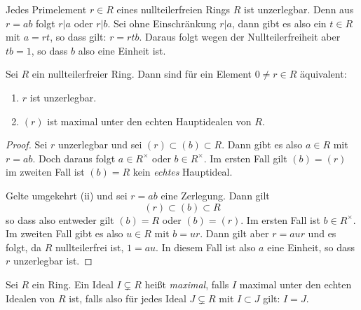 \documentclass{book}
\begin{document}
\begin{exa}
    \label{exa:primunzer}
    Jedes Primelement $r \in R$ eines nullteilerfreien Rings $R$ ist
    unzerlegbar. Denn aus $r = ab$ folgt $r | a$ oder $r | b$. Sei ohne
    Einschränkung $r|a$, dann gibt es also ein $t \in R$ mit $a = rt$, so dass
    gilt: $r = rtb$. Daraus folgt wegen der Nullteilerfreiheit aber $tb = 1$,
    so dass $b$ also eine Einheit ist. 
\end{exa}

\begin{prop}
    \label{prop:maximalhaupt}
    Sei $R$ ein nullteilerfreier Ring. Dann sind für ein Element $0 \ne r \in R$ äquivalent:
    \begin{enumerate}[label=(\roman *)]
        \item $r$ ist unzerlegbar.
        \item $(r)$ ist maximal unter den echten Hauptidealen von $R$. 
    \end{enumerate}
\end{prop}
\begin{proof}
    Sei $r$ unzerlegbar und sei $(r) \subset (b) \subset R$. Dann gibt es also
    $a \in R$ mit $r = ab$. Doch daraus folgt $a \in R^{\times}$ oder $b \in
    R^{\times}$. Im ersten Fall gilt $(b) = (r)$ im zweiten Fall ist $(b) = R$
    kein \emph{echtes} Hauptideal. 

    Gelte umgekehrt (ii) und sei $r = ab$ eine Zerlegung. Dann gilt
    \[
        (r) \subset (b) \subset R
    \]
    so dass also entweder gilt $(b) = R$ oder $(b) = (r)$. Im ersten Fall ist
    $b \in R^{\times}$. Im zweiten Fall gibt es also $u \in R$ mit $b = ur$. Dann gilt aber
    $r = aur$ und es folgt, da $R$ nullteilerfrei ist, $1 = au$. In diesem Fall
    ist also $a$ eine Einheit, so dass $r$ unzerlegbar ist. 
\end{proof}

\begin{defi}
    \label{defi:maximalideal}
    Sei $R$ ein Ring. Ein Ideal $I \subsetneq R$ heißt \emph{maximal}, falls
    $I$ maximal unter den echten Idealen von $R$ ist, falls also für jedes
    Ideal $J \subsetneq R$ mit $I \subset J$ gilt: $I = J$. 
\end{defi}
\end{document}
